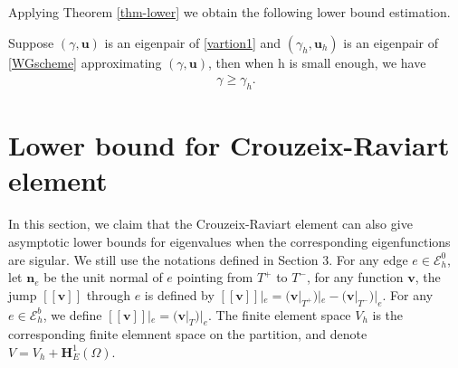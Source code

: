 \documentclass[leqno,CJK]{siamltex704}
\numberwithin{equation}{section}
\def\E{{\mathcal{E}}}
\def\dQ{{\mathbb{Q}}}
\def\sumT{\sum_{T\in\mathcal{T}_h}}     %
\def\bu{{\mathbf{u}}}
\def\bv{{\mathbf{v}}}
\def\bh{{\mathbf{H}}}
\def\bn{{\mathbf{n}}}
\newtheorem{remark}{Remark}[section]
\newcommand{\eps}{\varepsilon}
\begin{document}
Applying Theorem \ref{thm-lower} we obtain the following lower bound estimation.
\begin{theorem}
	Suppose $(\gamma,\bu)$ is an eigenpair of \eqref{vartion1} and $(\gamma_h,\bu_h)$ is an eigenpair of
	\eqref{WGscheme} approximating $(\gamma,\bu)$, then when h is small enough, we have
	\begin{eqnarray*}
		\gamma \ge \gamma_h.
	\end{eqnarray*}
\end{theorem}

	
\section{Lower bound for Crouzeix-Raviart element}In this section, we claim that the Crouzeix-Raviart element can also give asymptotic lower bounds for eigenvalues when the corresponding eigenfunctions are sigular. We still use the notations defined in Section 3. For any edge $e\in\E_h^0$, let $\bn_e$ be the unit normal of $e$ pointing from $T^{+}$ to $T^{-}$, for any function $\bv$, the jump $[\![\bv]\!]$ through $e$ is defined by $[\![\bv]\!]|_e=(\bv|_{T^{+}})|_e-(\bv|_{T^{-}})|_e$. For any $e\in\E_h^b$, we define $[\![\bv]\!]|_e=(\bv|_{T})|_e$. The finite element space $V_h$ is the corresponding finite elemnent space on the partition, and denote $V=V_h+\bh_E^1(\Omega)$.
\end{document}
